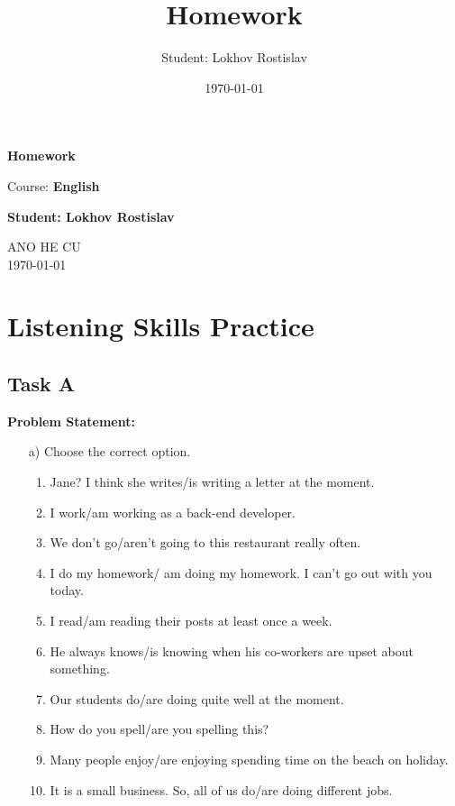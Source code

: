 \documentclass[a4paper,12pt]{article}
\title{Homework}
\author{Student: Lokhov Rostislav}
\date{\today}
\begin{document}
\begin{titlepage}
    \centering
    \vspace*{1cm}

    \Huge
    \textbf{Homework}

    \vspace{0.5cm}
    \LARGE
    Course: \textbf{English}

    \vspace{1.5cm}

    \textbf{Student: Lokhov Rostislav}

    \vfill

    \Large
    ANO HE CU\\
    \vspace{0.3cm}
    \today

\end{titlepage}

\tableofcontents
\newpage

\section{Listening Skills Practice}

\subsection{Task A}
\textbf{Problem Statement:}
\begin{itemize}
    \item[a)] Choose the correct option. 
    \begin{enumerate}
        \item Jane? I think she writes/is writing a letter at the moment.
        \item I work/am working as a back-end developer.
        \item We don’t go/aren’t going to this restaurant really often.
        \item I do my homework/ am doing my homework. I can’t go out with you today.
        \item I read/am reading their posts at least once a week.
        \item He always knows/is knowing when his co-workers are upset about something.
        \item Our students do/are doing quite well at the moment.
        \item How do you spell/are you spelling this?
        \item Many people enjoy/are enjoying spending time on the beach on holiday.
        \item It is a small business. So, all of us do/are doing different jobs.
    \end{enumerate}
\end{itemize}
\end{document}
